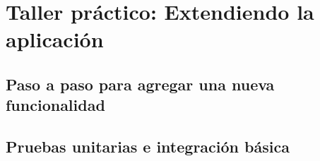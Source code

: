\chapter{Taller pr\'actico: Extendiendo la aplicaci\'on}
\section{Paso a paso para agregar una nueva funcionalidad}
\section{Pruebas unitarias e integraci\'on b\'asica}